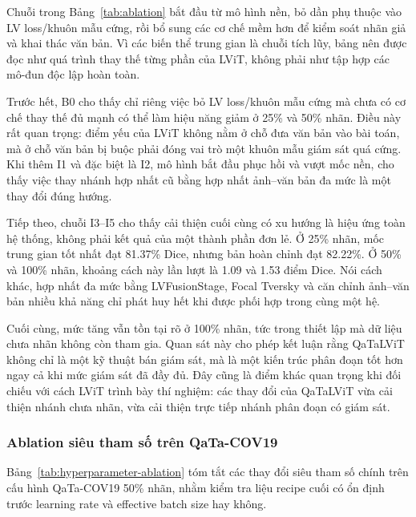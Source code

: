 Chuỗi trong Bảng~\ref{tab:ablation} bắt đầu từ mô hình nền, bỏ dần phụ thuộc vào LV loss/khuôn mẫu cứng, rồi bổ sung các cơ chế mềm hơn để kiểm soát nhãn giả và khai thác văn bản. Vì các biến thể trung gian là chuỗi tích lũy, bảng nên được đọc như quá trình thay thế từng phần của LViT, không phải như tập hợp các mô-đun độc lập hoàn toàn.

Trước hết, B0 cho thấy chỉ riêng việc bỏ LV loss/khuôn mẫu cứng mà chưa có cơ chế thay thế đủ mạnh có thể làm hiệu năng giảm ở 25\% và 50\% nhãn. Điều này rất quan trọng: điểm yếu của LViT không nằm ở chỗ đưa văn bản vào bài toán, mà ở chỗ văn bản bị buộc phải đóng vai trò một khuôn mẫu giám sát quá cứng. Khi thêm I1 và đặc biệt là I2, mô hình bắt đầu phục hồi và vượt mốc nền, cho thấy việc thay nhánh hợp nhất cũ bằng hợp nhất ảnh--văn bản đa mức là một thay đổi đúng hướng.

Tiếp theo, chuỗi I3--I5 cho thấy cải thiện cuối cùng có xu hướng là hiệu ứng toàn hệ thống, không phải kết quả của một thành phần đơn lẻ. Ở 25\% nhãn, mốc trung gian tốt nhất đạt 81.37\% Dice, nhưng bản hoàn chỉnh đạt 82.22\%. Ở 50\% và 100\% nhãn, khoảng cách này lần lượt là 1.09 và 1.53 điểm Dice. Nói cách khác, hợp nhất đa mức bằng LVFusionStage, Focal Tversky và căn chỉnh ảnh--văn bản nhiều khả năng chỉ phát huy hết khi được phối hợp trong cùng một hệ.

Cuối cùng, mức tăng vẫn tồn tại rõ ở 100\% nhãn, tức trong thiết lập mà dữ liệu chưa nhãn không còn tham gia. Quan sát này cho phép kết luận rằng QaTaLViT không chỉ là một kỹ thuật bán giám sát, mà là một kiến trúc phân đoạn tốt hơn ngay cả khi mức giám sát đã đầy đủ. Đây cũng là điểm khác quan trọng khi đối chiếu với cách LViT trình bày thí nghiệm: các thay đổi của QaTaLViT vừa cải thiện nhánh chưa nhãn, vừa cải thiện trực tiếp nhánh phân đoạn có giám sát.

\newpage

\subsubsection{Ablation siêu tham số trên QaTa-COV19}
\label{sec:hyperparameter-ablation}

Bảng~\ref{tab:hyperparameter-ablation} tóm tắt các thay đổi siêu tham số chính trên cấu hình QaTa-COV19 50\% nhãn, nhằm kiểm tra liệu recipe cuối có ổn định trước learning rate và effective batch size hay không.

